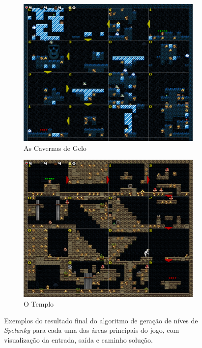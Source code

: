 \begin{figure}[H]
	\begin{subfigure}[b]{0.4\textwidth}
		\includegraphics[width=\textwidth]{fig/spelunky-ice-example.pdf}
		\caption{As Cavernas de Gelo}
		\label{fig:spelunky-ice-example2}
	\end{subfigure}
	\begin{subfigure}[b]{0.4\textwidth}
		\includegraphics[width=\textwidth]{fig/spelunky-temple-example.pdf}
		\caption{O Templo}
		\label{fig:spelunky-temple-example}
	\end{subfigure}
	\caption{Exemplos do resultado final do algoritmo de geração de níves de
	\textit{Spelunky} para cada uma das áreas principais do jogo, com
	visualização da entrada, saída e caminho solução.}
	\label{fig:spelunky-procgen-examples}
\end{figure}


